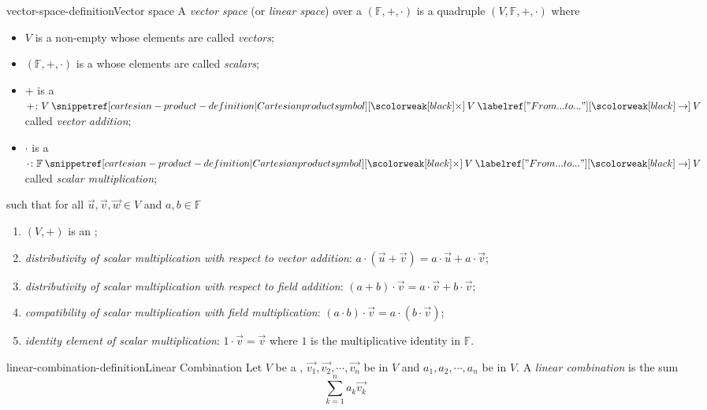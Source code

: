 \documentclass[preview]{standalone}
\begin{document}
\begin{snippetdefinition}{vector-space-definition}{Vector space}
    A \textit{vector space} (or \textit{linear space}) over a \field \((\mathbb{F}, +, \cdot)\) is a quadruple
    \((V, \mathbb{F}, +, \cdot)\) where
    \begin{itemize}
        \item \(V\) is a non-empty \set whose elements are called \textit{vectors};
        \item \((\mathbb{F}, +, \cdot)\) is a \field whose elements are called \textit{scalars};
        \item \(+\) is a \binoperation \(+\colon V \cartesianprod V \fromto V\) called \textit{vector addition};
        \item \(\cdot\) is a \binoperation \(\cdot\colon \mathbb{F} \cartesianprod V \fromto V\) called \textit{scalar multiplication};
    \end{itemize}
    such that for all \(\vec{u}, \vec{v}, \vec{w} \in V\) and \(a,b \in \mathbb{F}\)
    \begin{enumerate}
        \item \((V, +)\) is an \abeliangroup;
        \item \emph{distributivity of scalar multiplication with respect to vector addition}: 
        \(a \cdot (\vec{u} + \vec{v}) = a \cdot \vec{u} + a \cdot \vec{v}\);
        \item \emph{distributivity of scalar multiplication with respect to field addition}: 
        \((a + b) \cdot \vec{v} = a \cdot \vec{v} + b \cdot \vec{v}\);
        \item \emph{compatibility of scalar multiplication with field multiplication}: 
        \((a \cdot b) \cdot \vec{v} = a \cdot (b \cdot \vec{v})\);
        \item \emph{identity element of scalar multiplication}: 
        \(1 \cdot \vec{v} = \vec{v}\)
        where \(1\) is the multiplicative identity in \(\mathbb{F}\).
    \end{enumerate}
\end{snippetdefinition}

\begin{snippetdefinition}{linear-combination-definition}{Linear Combination}
    Let \(V\) be a \vectorspace,
    \(\vec{v_1}, \vec{v_2}, \cdots, \vec{v_n}\) be \vector[vectors] in \(V\) and
    \(a_1, a_2, \cdots, a_n\) be \vsscalar[scalars] in \(V\).
    A \textit{linear combination} is the sum
    \[
        \sum_{k=1}^n a_k\vec{v_k}
    \]
\end{snippetdefinition}
\end{document}
